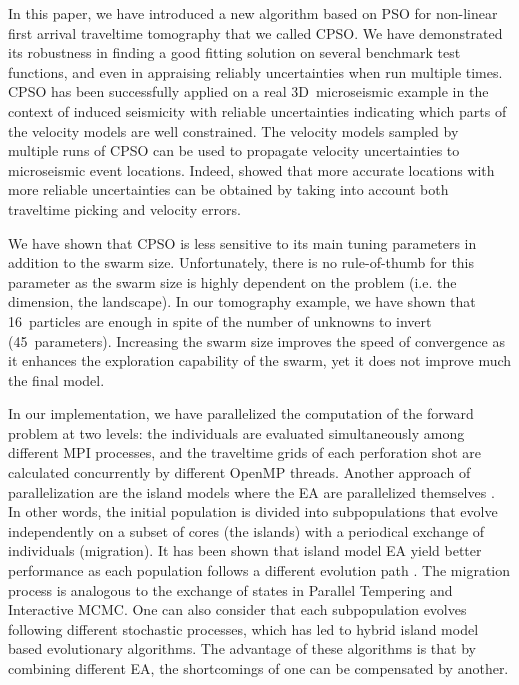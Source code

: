 In this paper, we have introduced a new algorithm based on PSO for non-linear first arrival traveltime tomography that we called CPSO. We have demonstrated its robustness in finding a good fitting solution on several benchmark test functions, and even in appraising reliably uncertainties when run multiple times. CPSO has been successfully applied on a real 3D~microseismic example in the context of induced seismicity with reliable uncertainties indicating which parts of the velocity models are well constrained. The velocity models sampled by multiple runs of CPSO can be used to propagate velocity uncertainties to microseismic event locations. Indeed, \cite{Gesret2015} showed that more accurate locations with more reliable uncertainties can be obtained by taking into account both traveltime picking and velocity errors.

We have shown that CPSO is less sensitive to its main tuning parameters in addition to the swarm size. Unfortunately, there is no rule-of-thumb for this parameter as the swarm size is highly dependent on the problem (i.e. the dimension, the landscape). In our tomography example, we have shown that 16~particles are enough in spite of the number of unknowns to invert (45~parameters). Increasing the swarm size improves the speed of convergence as it enhances the exploration capability of the swarm, yet it does not improve much the final model.

In our implementation, we have parallelized the computation of the forward problem at two levels: the individuals are evaluated simultaneously among different MPI processes, and the traveltime grids of each perforation shot are calculated concurrently by different OpenMP threads. Another approach of parallelization are the island models where the EA are parallelized themselves \citep{Gong2011, Gong2015}. In other words, the initial population is divided into subpopulations that evolve independently on a subset of {\color{\revision}cores} (the islands) with a periodical exchange of individuals (migration). It has been shown that island model EA yield better performance as each population follows a different evolution path \citep{Whitley1999}. The migration process is analogous to the exchange of states in Parallel Tempering and Interactive MCMC. One can also consider that each subpopulation evolves following different stochastic processes, which has led to hybrid island model based evolutionary algorithms. The advantage of these algorithms is that by combining different EA, the shortcomings of one can be compensated by another.

